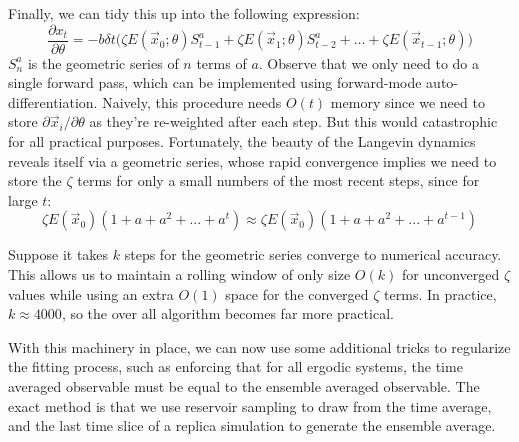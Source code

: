 \documentclass{article}
\begin{document}
Finally, we can tidy this up into the following expression:
\begin{equation}
\dfrac {\partial x_t}{\partial \theta} = -b  \delta t \Big( \zeta E(\vec{x}_0; \theta)S_{t-1}^a + \zeta E(\vec{x}_1;\theta)S_{t-2}^a + \ldots +  \zeta E(\vec{x}_{t-1};\theta) \Big)
\end{equation}
$S_n^a$ is the geometric series of $n$ terms of $a$. Observe that we only need to do a single forward pass, which can be implemented using forward-mode auto-differentiation. Naively, this procedure needs $O(t)$ memory since we need to store $\partial\vec{x}_i / \partial\theta$ as they're re-weighted after each step. But this would catastrophic for all practical purposes. Fortunately, the beauty of the Langevin dynamics reveals itself via a geometric series, whose rapid convergence implies we need to store the $\zeta$ terms for only a small numbers of the most recent steps, since for large $t$:
\begin{equation}
\zeta E(\vec{x}_0)(1+a+a^2+...+a^t) \approx \zeta E(\vec{x}_0)(1+a+a^2+...+a^{t-1})
\end{equation}

Suppose it takes $k$ steps for the geometric series converge to numerical accuracy. This allows us to maintain a rolling window of only size $O(k)$ for unconverged $\zeta$ values while using an extra $O(1)$ space for the converged $\zeta$ terms. In practice, $k \approx 4000$, so the over all algorithm becomes far more practical.

With this machinery in place, we can now use some additional tricks to regularize the fitting process, such as enforcing that for all ergodic systems, the time averaged observable must be equal to the ensemble averaged observable. The exact method is that we use reservoir sampling to draw from the time average, and the last time slice of a replica simulation to generate the ensemble average.
\end{document}
